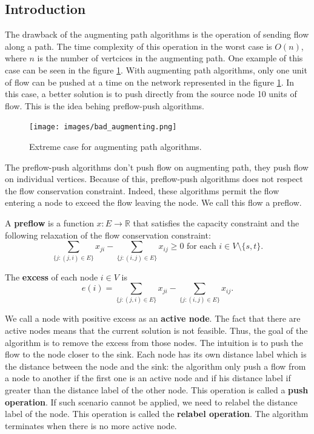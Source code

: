\subsection{Introduction}

The drawback of the augmenting path algorithms is the operation of sending flow along a path. The time complexity of this operation in the worst case is $O(n)$, where $n$ is the number of vertcices in the augmenting path. One example of this case can be seen in the figure \ref{img:bad_augmenting}. With augmenting path algorithms, only one unit of flow can be pushed at a time on the network represented in the figure \ref{img:bad_augmenting}. In this case, a better solution is to push directly from the source node 10 units of flow. This is the idea behing preflow-push algorithms.

\begin{figure}[H]
\centering
\texttt{[image: images/bad\_augmenting.png]}
\caption{Extreme case for augmenting path algorithms.}
\label{img:bad_augmenting}
\end{figure}

The preflow-push algorithms don't push flow on augmenting path, they push flow on individual vertices. Because of this, preflow-push algorithms does not respect the flow conservation constraint. Indeed, these algorithms permit the flow entering a node to exceed the flow leaving the node. We call this flow a preflow.

\begin{definition}
\label{preflow}
A \textbf{preflow} is a function $x: E \to \mathbb{R}$ that satisfies the capacity constraint and the following relaxation of the flow conservation constraint:
$$\sum\limits_{\{j : (j,i) \in E\}} x_{ji} - \sum\limits_{\{j : (i,j) \in E\}} x_{ij} \geq 0 \text{	for each } i \in V \setminus \{s, t\}.$$
\end{definition}

\begin{definition}
\label{excess}
The \textbf{excess} of each node $i \in V$ is 
$$e(i) = \sum\limits_{\{j : (j,i) \in E\}} x_{ji} - \sum\limits_{\{j : (i,j) \in E\}} x_{ij}.$$
\end{definition}

We call a node with positive excess as an \textbf{active node}. The fact that there are active nodes means that the current solution is not feasible. Thus, the goal of the algorithm is to remove the excess from those nodes. The intuition is to push the flow to the node closer to the sink. Each node has its own distance label which is the distance between the node and the sink: the algorithm only push a flow from a node to another if the first one is an active node and if his distance label if greater than the distance label of the other node. This operation is called a \textbf{push operation}. If such scenario cannot be applied, we need to relabel the distance label of the node. This operation is called the \textbf{relabel operation}. The algorithm terminates when there is no more active node.

